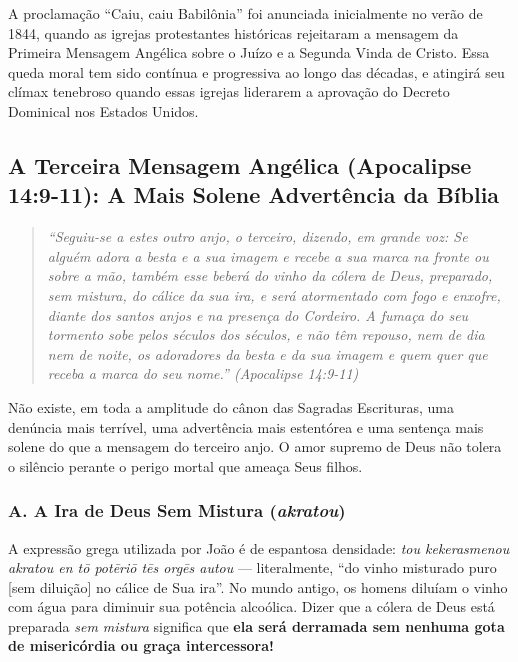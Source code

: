 A proclamação ``Caiu, caiu Babilônia'' foi anunciada inicialmente no verão de 1844, quando as igrejas protestantes históricas rejeitaram a mensagem da Primeira Mensagem Angélica sobre o Juízo e a Segunda Vinda de Cristo. Essa queda moral tem sido contínua e progressiva ao longo das décadas, e atingirá seu clímax tenebroso quando essas igrejas liderarem a aprovação do Decreto Dominical nos Estados Unidos.



\subsection{A Terceira Mensagem Angélica (Apocalipse 14:9-11): A Mais Solene Advertência da Bíblia}



\begin{quote}
\itshape \textit{``Seguiu-se a estes outro anjo, o terceiro, dizendo, em grande voz: Se alguém adora a besta e a sua imagem e recebe a sua marca na fronte ou sobre a mão, também esse beberá do vinho da cólera de Deus, preparado, sem mistura, do cálice da sua ira, e será atormentado com fogo e enxofre, diante dos santos anjos e na presença do Cordeiro. A fumaça do seu tormento sobe pelos séculos dos séculos, e não têm repouso, nem de dia nem de noite, os adoradores da besta e da sua imagem e quem quer que receba a marca do seu nome.''} (Apocalipse 14:9-11)
\end{quote}


Não existe, em toda a amplitude do cânon das Sagradas Escrituras, uma denúncia mais terrível, uma advertência mais estentórea e uma sentença mais solene do que a mensagem do terceiro anjo. O amor supremo de Deus não tolera o silêncio perante o perigo mortal que ameaça Seus filhos.


\subsubsection*{A. A Ira de Deus Sem Mistura (\textit{akratou})}

A expressão grega utilizada por João é de espantosa densidade: \textit{tou kekerasmenou akratou en tō potēriō tēs orgēs autou} — literalmente, ``do vinho misturado puro [sem diluição] no cálice de Sua ira''. No mundo antigo, os homens diluíam o vinho com água para diminuir sua potência alcoólica. Dizer que a cólera de Deus está preparada \textit{sem mistura} significa que \textbf{ela será derramada sem nenhuma gota de misericórdia ou graça intercessora!}

